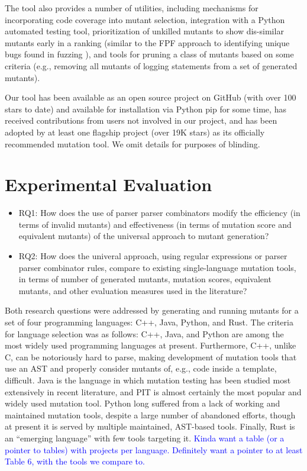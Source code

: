 \documentclass[sigconf,review, anonymous]{acmart}
\newcommand{\clg}[1]{\textcolor{blue}{#1}}
\begin{document}
{The tool also provides a number of utilities, including mechanisms for
incorporating code coverage into mutant selection, integration with a
Python automated testing tool, prioritization of unkilled mutants to
show dis-similar mutants early in a ranking (similar to the FPF
approach to identifying unique bugs found in fuzzing
\cite{10.1145/2491956.2462173}), and tools for pruning a class of
mutants based on some criteria (e.g., removing all mutants of logging
statements from a set of generated mutants).

Our tool has been available as an open source project on GitHub (with
over 100 stars to date) and
available for installation via Python pip for
some time, has received contributions from users not involved in
our project, and has been adopted by at least one flagship project
(over 19K stars) as
its officially recommended mutation tool.  We omit details for
purposes of blinding.

\section{Experimental Evaluation}

\begin{itemize}

  \item{RQ1:}  How does the use of parser parser combinators modify 
    the efficiency (in terms of invalid mutants) and effectiveness (in
    terms of mutation score and equivalent mutants) of the universal
    approach to mutant generation?

\item{RQ2:}  How does the univeral approach, using regular expressions
  or parser parser combinator rules, compare to existing
  single-language mutation tools, in terms of number of generated
  mutants, mutation scores, equivalent mutants, and other evaluation measures used in the literature?

\end{itemize}


Both research questions were addressed by generating and running
mutants for a set of four programming languages: C++, Java, Python,
and Rust.  The criteria for language selection was as follows: C++,
Java, and Python are among the most widely used programming languages
at present.  Furthermore, C++, unlike C, can be notoriously hard to
parse, making development of mutation tools that use an AST and
properly consider mutants of, e.g., code inside a template,
difficult.  Java is the language in which mutation testing has been
studied most extensively in recent literature, and PIT is almost
certainly the most popular and widely used mutation tool.  Python long
suffered from a lack of working and maintained mutation tools, despite
a large number of abandoned efforts, though at present it is served by
multiple maintained, AST-based tools.  Finally, Rust is an ``emerging
language'' with few tools targeting it.
\clg{Kinda want a table (or a pointer to tables) with projects per language.
  Definitely want a pointer to at least Table 6, with the tools we compare to.}

}
\end{document}
